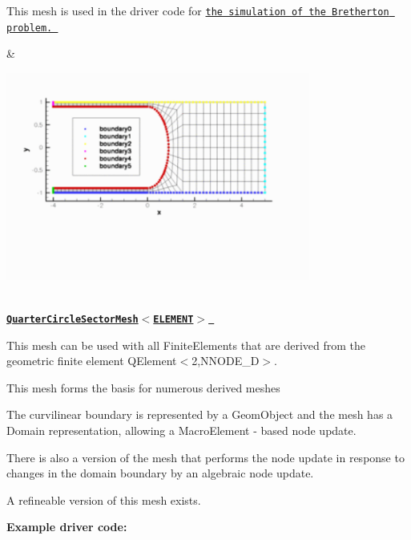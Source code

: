 \begin{center}
\begin{longtabu}
\begin{DoxyItemize}
\item This mesh is used in the driver code for \href{../../../navier_stokes/bretherton/html/index.html}{\tt the simulation of the Bretherton problem. }
\end{DoxyItemize}& 
\begin{DoxyImageNoCaption}
  \mbox{\includegraphics[width=0.75\textwidth]{bretherton_spine_mesh}}
\end{DoxyImageNoCaption}
   \\
\href{classoomph_1_1QuarterCircleSectorMesh.html}{\tt {\bfseries  Quarter\+Circle\+Sector\+Mesh$<$\+E\+L\+E\+M\+E\+N\+T$>$ }} ~\newline
~\newline

\begin{DoxyItemize}
\item This mesh can be used with all {\ttfamily Finite\+Elements} that are derived from the geometric finite element {\ttfamily Q\+Element$<$2,\+N\+N\+O\+D\+E\+\_\+D$>$}.
\item This mesh forms the basis for numerous derived meshes
\item The curvilinear boundary is represented by a {\ttfamily Geom\+Object} and the mesh has a {\ttfamily Domain} representation, allowing a {\ttfamily Macro\+Element} -\/ based node update.
\item There is also a version of the mesh that performs the node update in response to changes in the domain boundary by an algebraic node update.
\item A refineable version of this mesh exists.
\end{DoxyItemize}{\bfseries Example driver code\+:} ~\newline


\end{longtabu}
\end{center}
